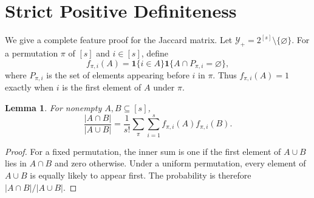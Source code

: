 \documentclass[twoside]{article}
\newtheorem{lemma}[theorem]{Lemma}
\newcommand{\Y}{\mathcal Y}
\newcommand{\1}{\mathbf 1}
\begin{document}
\runningauthor{}

\section{Strict Positive Definiteness}

We give a complete feature proof for the Jaccard matrix. Let $\Y_+=2^{[s]}\setminus\{\varnothing\}$. For a permutation $\pi$ of $[s]$ and $i\in[s]$, define
\begin{equation}
f_{\pi,i}(A)=\mathbf1\{i\in A\}\mathbf1\{A\cap P_{\pi,i}=\varnothing\},
\label{eq:supp-feature}
\end{equation}
where $P_{\pi,i}$ is the set of elements appearing before $i$ in $\pi$. Thus $f_{\pi,i}(A)=1$ exactly when $i$ is the first element of $A$ under $\pi$.

\begin{lemma}
For nonempty $A,B\subseteq[s]$,
\begin{equation}
\frac{|A\cap B|}{|A\cup B|}
=\frac1{s!}\sum_\pi\sum_{i=1}^s f_{\pi,i}(A)f_{\pi,i}(B).
\label{eq:supp-minhash}
\end{equation}
\end{lemma}

\begin{proof}
For a fixed permutation, the inner sum is one if the first element of $A\cup B$ lies in $A\cap B$ and zero otherwise. Under a uniform permutation, every element of $A\cup B$ is equally likely to appear first. The probability is therefore $|A\cap B|/|A\cup B|$.
\end{proof}
\end{document}
